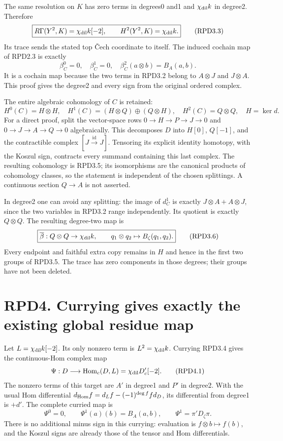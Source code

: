 The same resolution on \(K\) has zero terms in degrees0 and1 and
\(\chi_{\rm dil}k\) in degree2. Therefore \[
\boxed{R\Gamma(Y^2,K)=\chi_{\rm dil}k[-2],\qquad
H^2(Y^2,K)=\chi_{\rm dil}k.}
\tag{RPD3.3}
\] Its trace sends the stated top Čech coordinate to itself. The induced
cochain map of RPD2.3 is exactly \[
\beta_C^0=0,\quad\beta_C^1=0,\quad
\beta_C^2(a\otimes b)=B_A(a,b).
\tag{RPD3.4}
\] It is a cochain map because the two terms in RPD3.2 belong to
\(A\otimes J\) and \(J\otimes A\). This proof gives the degree2 and
every sign from the original ordered complex.

The entire algebraic cohomology of \(C\) is retained: \[
H^0(C)=H\otimes H,\quad
H^1(C)=(H\otimes Q)\oplus(Q\otimes H),\quad
H^2(C)=Q\otimes Q,\quad H=\ker d.
\tag{RPD3.5}
\] For a direct proof, split the vector-space rows
\(0\to H\to P\to J\to0\) and \(0\to J\to A\to Q\to0\) algebraically.
This decomposes \(D\) into \(H[0]\), \(Q[-1]\), and the contractible
complex \([J\xrightarrow{\mathrm{id}}J]\). Tensoring its explicit
identity homotopy, with the Koszul sign, contracts every summand
containing this last complex. The resulting cohomology is RPD3.5; its
isomorphisms are the canonical products of cohomology classes, so the
statement is independent of the chosen splittings. A continuous section
\(Q\to A\) is not asserted.

In degree2 one can avoid any splitting: the image of \(d_C^1\) is
exactly \(J\otimes A+A\otimes J\), since the two variables in RPD3.2
range independently. Its quotient is exactly \(Q\otimes Q\). The
resulting degree-two map is \[
\boxed{\overline\beta:Q\otimes Q\to\chi_{\rm dil}k,\qquad
q_1\otimes q_2\mapsto B_\zeta(q_1,q_2).}
\tag{RPD3.6}
\] Every endpoint and faithful extra copy remains in \(H\) and hence in
the first two groups of RPD3.5. The trace has zero components in those
degrees; their groups have not been deleted.

\section{RPD4. Currying gives exactly the existing global residue
map}\label{rpd4.-currying-gives-exactly-the-existing-global-residue-map}

Let \(L=\chi_{\rm dil}k[-2]\). Its only nonzero term is
\(L^2=\chi_{\rm dil}k\). Currying RPD3.4 gives the continuous-Hom
complex map \[
\Psi:D\longrightarrow\operatorname{Hom}_c(D,L)
=\chi_{\rm dil}D'_c[-2].
\tag{RPD4.1}
\] The nonzero terms of this target are \(A'\) in degree1 and \(P'\) in
degree2. With the usual Hom differential
\(d_{\rm Hom}f=d_Lf-(-1)^{\deg f}f d_D\), its differential from degree1
is \(+d'\). The complete curried map is \[
\boxed{\Psi^0=0,\qquad
\Psi^1(a)(b)=B_A(a,b),\qquad
\Psi^1=\pi'D_\zeta\pi.}
\tag{RPD4.2}
\] There is no additional minus sign in this currying: evaluation is
\(f\otimes b\mapsto f(b)\), and the Koszul signs are already those of
the tensor and Hom differentials.

